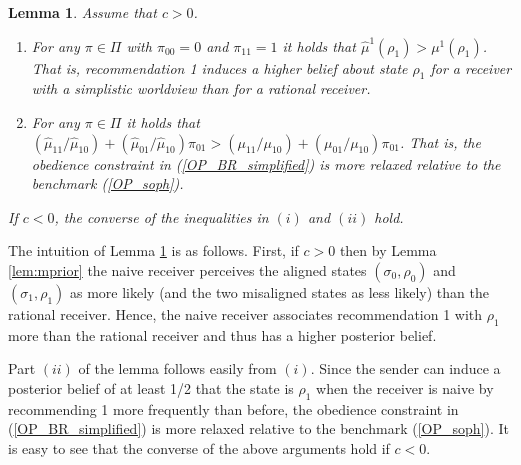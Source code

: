 \documentclass[12pt,english]{article}
\newtheorem{lemma}{Lemma}
\theoremstyle{plain}
\begin{document}
\begin{lemma}\label{pr:pre-main}
Assume that $c>0$. 
\begin{enumerate}[label=(\roman*)]
    \item For any $\pi\in\Pi$ with $\pi_{00}=0$ and $\pi_{11}=1$ it holds that $\hat{\mu}^{1}(\rho_{1})>\mu^{1}(\rho_{1})$. That is, recommendation 1 induces a higher belief about state $\rho_1$ for a receiver with a simplistic worldview than for a rational receiver. 
    \item For any $\pi\in\Pi$ it holds that $(\hat{\mu}_{11}/\hat{\mu}_{10})+(\hat{\mu}_{01}/\hat{\mu}_{10})\pi_{01}>(\mu_{11}/\mu_{10})+(\mu_{01}/\mu_{10})\pi_{01}$. That is, the obedience constraint in (\ref{OP_BR_simplified}) is more relaxed relative to the benchmark (\ref{OP_soph}). 
\end{enumerate}
If $c<0$, the converse of the inequalities in $(i)$ and $(ii)$ hold. 
\end{lemma}

The intuition of Lemma \ref{pr:pre-main} is as follows. 
First, if $c>0$ then by Lemma \ref{lem:mprior} the naive receiver perceives the aligned states $\left(\sigma_{0},\rho_{0}\right)$ and $\left(\sigma_{1},\rho_{1}\right)$ as more likely (and the two misaligned states as less likely) than the rational receiver. 
Hence, the naive receiver associates recommendation 1 with $\rho_1$ more than the rational receiver and thus has a higher posterior belief.  

Part $(ii)$ of the lemma follows easily from $(i)$. 
Since the sender can induce a posterior belief of at least 1/2 that the state is $\rho_1$ when the receiver is naive by recommending 1 more frequently than before, the obedience constraint in (\ref{OP_BR_simplified}) is more relaxed relative to the benchmark (\ref{OP_soph}).
It is easy to see that the converse of the above arguments hold if $c<0$. 
\end{document}
